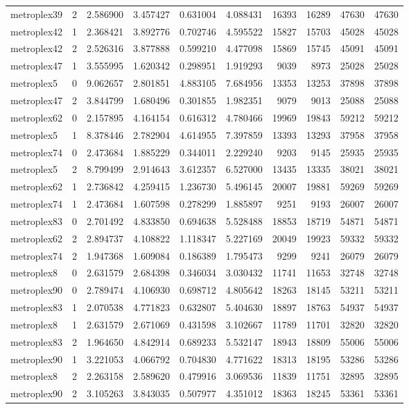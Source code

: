 \begin{longtable}{|l|r|r|r|r|r|r|r|r|r|}
metroplex39 & 2 & 2.586900 & 3.457427 & 0.631004 & 4.088431 & 16393 & 16289 & 47630 & 47630 \\
metroplex42 & 1 & 2.368421 & 3.892776 & 0.702746 & 4.595522 & 15827 & 15703 & 45028 & 45028 \\
metroplex42 & 2 & 2.526316 & 3.877888 & 0.599210 & 4.477098 & 15869 & 15745 & 45091 & 45091 \\
metroplex47 & 1 & 3.555995 & 1.620342 & 0.298951 & 1.919293 & 9039 & 8973 & 25028 & 25028 \\
metroplex5 & 0 & 9.062657 & 2.801851 & 4.883105 & 7.684956 & 13353 & 13253 & 37898 & 37898 \\
metroplex47 & 2 & 3.844799 & 1.680496 & 0.301855 & 1.982351 & 9079 & 9013 & 25088 & 25088 \\
metroplex62 & 0 & 2.157895 & 4.164154 & 0.616312 & 4.780466 & 19969 & 19843 & 59212 & 59212 \\
metroplex5 & 1 & 8.378446 & 2.782904 & 4.614955 & 7.397859 & 13393 & 13293 & 37958 & 37958 \\
metroplex74 & 0 & 2.473684 & 1.885229 & 0.344011 & 2.229240 & 9203 & 9145 & 25935 & 25935 \\
metroplex5 & 2 & 8.799499 & 2.914643 & 3.612357 & 6.527000 & 13435 & 13335 & 38021 & 38021 \\
metroplex62 & 1 & 2.736842 & 4.259415 & 1.236730 & 5.496145 & 20007 & 19881 & 59269 & 59269 \\
metroplex74 & 1 & 2.473684 & 1.607598 & 0.278299 & 1.885897 & 9251 & 9193 & 26007 & 26007 \\
metroplex83 & 0 & 2.701492 & 4.833850 & 0.694638 & 5.528488 & 18853 & 18719 & 54871 & 54871 \\
metroplex62 & 2 & 2.894737 & 4.108822 & 1.118347 & 5.227169 & 20049 & 19923 & 59332 & 59332 \\
metroplex74 & 2 & 1.947368 & 1.609084 & 0.186389 & 1.795473 & 9299 & 9241 & 26079 & 26079 \\
metroplex8 & 0 & 2.631579 & 2.684398 & 0.346034 & 3.030432 & 11741 & 11653 & 32748 & 32748 \\
metroplex90 & 0 & 2.789474 & 4.106930 & 0.698712 & 4.805642 & 18263 & 18145 & 53211 & 53211 \\
metroplex83 & 1 & 2.070538 & 4.771823 & 0.632807 & 5.404630 & 18897 & 18763 & 54937 & 54937 \\
metroplex8 & 1 & 2.631579 & 2.671069 & 0.431598 & 3.102667 & 11789 & 11701 & 32820 & 32820 \\
metroplex83 & 2 & 1.964650 & 4.842914 & 0.689233 & 5.532147 & 18943 & 18809 & 55006 & 55006 \\
metroplex90 & 1 & 3.221053 & 4.066792 & 0.704830 & 4.771622 & 18313 & 18195 & 53286 & 53286 \\
metroplex8 & 2 & 2.263158 & 2.589620 & 0.479916 & 3.069536 & 11839 & 11751 & 32895 & 32895 \\
metroplex90 & 2 & 3.105263 & 3.843035 & 0.507977 & 4.351012 & 18363 & 18245 & 53361 & 53361 \\
\end{longtable}
